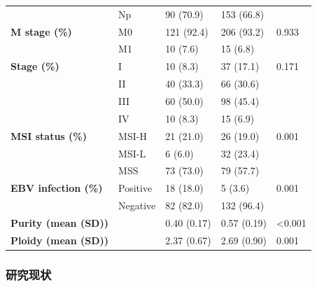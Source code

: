 \begin{table}[htbp]
\begin{tabular}{lllll}
            & Np    & 90 (70.9) & 153 (66.8) &  \\
    \textbf{M stage (\%)} & M0    & 121 (92.4) & 206 (93.2) & 0.933 \\
            & M1    & 10 (7.6) & 15 (6.8) &  \\
    \textbf{Stage (\%)} & I     & 10 (8.3) & 37 (17.1) & 0.171 \\
            & II    & 40 (33.3) & 66 (30.6) &  \\
            & III   & 60 (50.0) & 98 (45.4) &  \\
            & IV    & 10 (8.3) & 15 (6.9) &  \\
    \textbf{MSI status (\%)} & MSI-H & 21 (21.0) & 26 (19.0) & 0.001 \\
            & MSI-L & 6 (6.0) & 32 (23.4) &  \\
            & MSS   & 73 (73.0) & 79 (57.7) &  \\
    \textbf{EBV infection (\%)} & Positive & 18 (18.0) & 5 (3.6) & 0.001 \\
            & Negative & 82 (82.0) & 132 (96.4) &  \\
    \textbf{Purity (mean (SD))} &       & 0.40 (0.17) & 0.57 (0.19) & <0.001 \\
    \textbf{Ploidy (mean (SD))} &       & 2.37 (0.67) & 2.69 (0.90) & 0.001 \\
    \bottomrule
    \end{tabular}%
    \label{table1}%
\end{table}%

\clearpage

\subsubsection{研究现状}

\indent\setlength{\parindent}{2em}%

